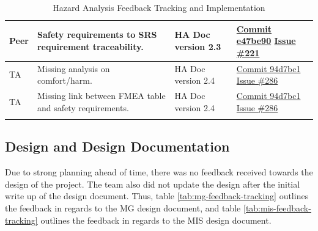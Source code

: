 \documentclass{article}
\begin{document}
\begin{longtable}{|p{2cm}|p{4.5cm}|p{3.5cm}|p{3cm}|}
    Peer &
    Safety requirements to SRS requirement traceability. &
    HA Doc version 2.3 & 
    \href{https://github.com/Team6-SixSense/audio360/commit/e47be90}{Commit
        e47be90}
    \newline
    \href{https://github.com/Team6-SixSense/audio360/issues/221}{Issue \#221} \\
    \hline

    TA &
    Missing analysis on comfort/harm. &
    HA Doc version 2.4 & 
    \href{https://github.com/Team6-SixSense/audio360/commit/94d7bc1}{Commit
        94d7bc1}
    \newline
    \href{https://github.com/Team6-SixSense/audio360/issues/286}{Issue \#286} \\
    \hline

    TA &
    Missing link between FMEA table and safety requirements. &
    HA Doc version 2.4 & 
    \href{https://github.com/Team6-SixSense/audio360/commit/94d7bc1}{Commit
        94d7bc1}
    \newline
    \href{https://github.com/Team6-SixSense/audio360/issues/286}{Issue \#286} \\
    \hline

    \caption{Hazard Analysis Feedback Tracking and Implementation}
\end{longtable}


\subsection{Design and Design Documentation}

Due to strong planning ahead of time, there was no feedback received towards the
design of the project. The team also did not update the design after the initial
write up of the design document. Thus, table \ref{tab:mg-feedback-tracking}
outlines the feedback in regards to the MG design document, and table
\ref{tab:mis-feedback-tracking} outlines the feedback in regards to the MIS 
design document.
\end{document}
